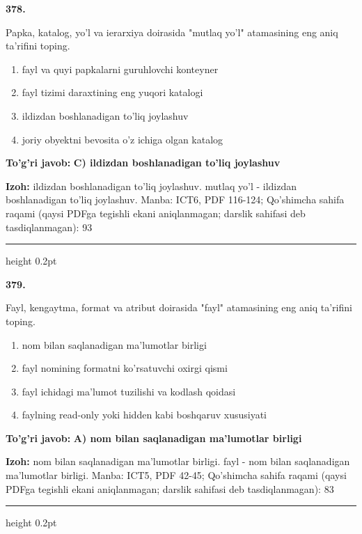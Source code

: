\documentclass[10pt,a4paper]{article}
\begin{document}
{\bfseries\sffamily\color{ink} 378.}
\par
Papka, katalog, yo'l va ierarxiya doirasida "mutlaq yo'l" atamasining eng aniq ta'rifini toping.
\begin{enumerate}[label=\Alph*),leftmargin=9mm]
\item fayl va quyi papkalarni guruhlovchi konteyner
\item fayl tizimi daraxtining eng yuqori katalogi
\item ildizdan boshlanadigan to'liq joylashuv
\item joriy obyektni bevosita o'z ichiga olgan katalog
\end{enumerate}
\begin{tcolorbox}[enhanced,breakable,colback=teal!4,colframe=teal!60!black,boxrule=0.45pt,arc=1.2mm,left=2.7mm,right=2.7mm,top=1.8mm,bottom=1.8mm,before skip=2mm,after skip=2mm]
{\bfseries\sffamily\color{teal}To'g'ri javob:} \textbf{C) ildizdan boshlanadigan to'liq joylashuv}
\par\smallskip
{\bfseries Izoh:} ildizdan boshlanadigan to'liq joylashuv. mutlaq yo'l - ildizdan boshlanadigan to'liq joylashuv. Manba: ICT6, PDF 116-124; Qo'shimcha sahifa raqami (qaysi PDFga tegishli ekani aniqlanmagan; darslik sahifasi deb tasdiqlanmagan): 93
\end{tcolorbox}
\vspace{2mm}\hrule height 0.2pt\vspace{3mm}

{\bfseries\sffamily\color{ink} 379.}
\par
Fayl, kengaytma, format va atribut doirasida "fayl" atamasining eng aniq ta'rifini toping.
\begin{enumerate}[label=\Alph*),leftmargin=9mm]
\item nom bilan saqlanadigan ma'lumotlar birligi
\item fayl nomining formatni ko'rsatuvchi oxirgi qismi
\item fayl ichidagi ma'lumot tuzilishi va kodlash qoidasi
\item faylning read-only yoki hidden kabi boshqaruv xususiyati
\end{enumerate}
\begin{tcolorbox}[enhanced,breakable,colback=teal!4,colframe=teal!60!black,boxrule=0.45pt,arc=1.2mm,left=2.7mm,right=2.7mm,top=1.8mm,bottom=1.8mm,before skip=2mm,after skip=2mm]
{\bfseries\sffamily\color{teal}To'g'ri javob:} \textbf{A) nom bilan saqlanadigan ma'lumotlar birligi}
\par\smallskip
{\bfseries Izoh:} nom bilan saqlanadigan ma'lumotlar birligi. fayl - nom bilan saqlanadigan ma'lumotlar birligi. Manba: ICT5, PDF 42-45; Qo'shimcha sahifa raqami (qaysi PDFga tegishli ekani aniqlanmagan; darslik sahifasi deb tasdiqlanmagan): 83
\end{tcolorbox}
\vspace{2mm}\hrule height 0.2pt\vspace{3mm}
\end{document}
